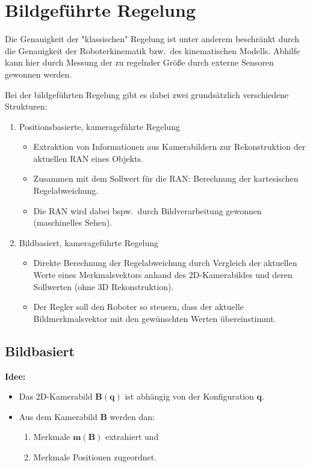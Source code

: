 \documentclass[a4paper, 11pt, accentcolor = tud3b]{tudreport}
\newcommand{\mat}[1]{\boldsymbol{#1}}
\renewcommand{\vec}[1]{\boldsymbol{#1}}
\newcommand{\bzw}{bzw.~}
\newcommand{\bspw}{bspw.~}
\begin{document}
		\section{Bildgeführte Regelung}
			Die Genauigkeit der "klassischen" Regelung ist unter anderem beschränkt durch die Genauigkeit der Roboterkinematik \bzw des kinematischen Modells. Abhilfe kann hier durch Messung der zu regelnder Größe durch externe Sensoren gewonnen werden.
			
			Bei der bildgeführten Regelung gibt es dabei zwei grundsätzlich verschiedene Strukturen:
			\begin{enumerate}
				\item Positionsbasierte, kamerageführte Regelung
					\begin{itemize}
						\item Extraktion von Informationen aus Kamerabildern zur Rekonstruktion der aktuellen RAN eines Objekts.
						\item Zusammen mit dem Sollwert für die RAN: Berechnung der kartesischen Regelabweichung.
						\item Die RAN wird dabei \bspw durch Bildverarbeitung gewonnen (maschinelles Sehen).
					\end{itemize}
				\item Bildbasiert, kamerageführte Regelung
					\begin{itemize}
						\item Direkte Berechnung der Regelabweichung durch Vergleich der aktuellen Werte eines Merkmalsvektors anhand des 2D-Kamerabildes und deren Sollwerten (ohne 3D Rekonstruktion).
						\item Der Regler soll den Roboter so steuern, dass der aktuelle Bildmerkmalsvektor mit den gewünschten Werten übereinstimmt.
					\end{itemize}
			\end{enumerate}

			\subsection{Bildbasiert}
				\textbf{Idee:}
				\begin{itemize}
					\item Das 2D-Kamerabild \( \mat{B}(\vec{q}) \) ist abhängig von der Konfiguration \( \vec{q} \).
					\item Aus dem Kamerabild \( \mat{B} \) werden dan:
						\begin{enumerate}
							\item Merkmale \( \vec{m}(\mat{B}) \) extrahiert und
							\item Merkmale Positionen zugeordnet.
						\end{enumerate}
				\end{itemize}
			
\end{document}
